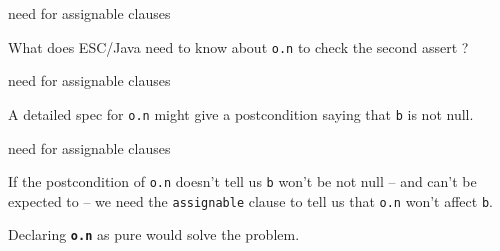 \documentclass[
pdf,
nocolorBG,
slideColor,
cok,
]{prosper}
\newcommand{\code}[1]{{\rm \texttt{\textbf{\scriptsize #1}}}}
\begin{document}
\begin{slide}{need for assignable clauses}
\vspace*{-6ex}


What does ESC/Java need to know about \texttt{o.n} to check the second assert ?

\end{slide}


\begin{slide}{need for assignable clauses}
\vspace*{-6ex}


A detailed spec for \texttt{o.n} might give a postcondition saying
that \texttt{b} is not null.

\end{slide}


\begin{slide}{need for assignable clauses}
\vspace*{-6ex}


If the postcondition of \texttt{o.n} doesn't tell us \texttt{b} won't be not null
-- and can't be expected to -- we need the \texttt{assignable} clause to
tell us that \texttt{o.n} won't affect \texttt{b}.

\medskip

{\scriptsize Declaring \texttt{\textbf{o.n}} as pure would solve the problem.}


\end{slide}
\end{document}
